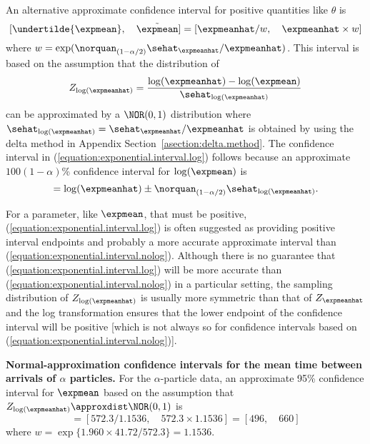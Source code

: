 An alternative approximate confidence interval for positive quantities
like $\theta$ is
\begin{equation}
\label{equation:exponential.interval.log}
[ \undertilde{\expmean}, \quad \tilde{\expmean}]=
	[\expmeanhat/w, \quad \expmeanhat \times w]
\end{equation}
where $w=\exp(\norquan_{(1-\alpha/2)}\sehat_{\expmeanhat}/\expmeanhat)$.
This interval is based on the assumption that the distribution of
\begin{equation}
\label{equation:expmean.pivotal.like}
Z_{\log(\expmeanhat)} = \frac{\log(\expmeanhat)-
	\log(\expmean)}{\sehat_{\log(\expmeanhat)}}
\end{equation}
can be approximated by a $\NOR(0,1)$ distribution
where $\sehat_{\log(\expmeanhat)}=\sehat_{\expmeanhat}/\expmeanhat$
is obtained by using the delta method in
Appendix Section~\ref{asection:delta.method}. The confidence interval in 
(\ref{equation:exponential.interval.log})
follows because an approximate $100(1-\alpha)$\% confidence
interval for $\log(\expmean)$ is
\begin{displaymath}
[\undertilde{\log(\expmean)}, \quad  \tilde{\log(\expmean)}] =
\log(\expmeanhat) \pm \norquan_{(1-\alpha/2)}
\sehat_{\log(\expmeanhat)} .
\end{displaymath}


For a parameter,
like $\expmean$, that must be positive,
(\ref{equation:exponential.interval.log}) is often suggested as
providing positive interval endpoints and probably
a more accurate approximate interval than
(\ref{equation:exponential.interval.nolog}).  Although there is no
guarantee that (\ref{equation:exponential.interval.log}) will be more
accurate than (\ref{equation:exponential.interval.nolog}) in a
particular setting, the sampling distribution of
$Z_{\log(\expmeanhat)}$ is usually more symmetric than that of
$Z_{\expmeanhat}$ and the log transformation ensures that the
lower endpoint of the confidence interval will be positive [which is
not always so for confidence intervals based on
(\ref{equation:exponential.interval.nolog})].

\begin{example}
{\bf Normal-approximation confidence intervals for the mean time
between arrivals of $\alpha$ particles.} For the $\alpha$-particle
data, an approximate 95\% confidence interval for $\expmean$ 
based on the assumption that $Z_{\log(\expmeanhat)}\approxdist \NOR(0,1)$
is
\begin{displaymath}
 [ \undertilde{\expmean},\quad  \tilde{\expmean}] =
[572.3/1.1536, \quad
	 572.3 \times 1.1536] = [496, \quad 660]
\end{displaymath}
where $w=\exp\{1.960 \times 41.72/572.3\}=1.1536$.
\end{example}



